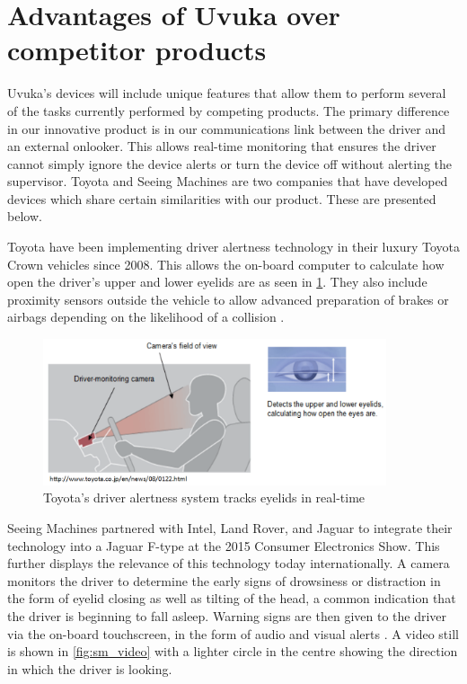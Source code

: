 \section{Advantages of Uvuka over competitor products}
\label{sec:advantages}
Uvuka's devices will include unique features that allow them to perform several of the tasks currently performed by competing products. The primary difference in our innovative product is in our communications link between the driver and an external onlooker. This allows real-time monitoring that ensures the driver cannot simply ignore the device alerts or turn the device off without alerting the supervisor. Toyota and Seeing Machines are two companies that have developed devices which share certain similarities with our product. These are presented below.

Toyota have been implementing driver alertness technology in their luxury Toyota Crown vehicles since 2008. This allows the on-board computer to calculate how open the driver's upper and lower eyelids are as seen in \cref{fig:toyota_sensors}. They also include proximity sensors outside the vehicle to allow advanced preparation of brakes or airbags depending on the likelihood of a collision \cite{toyota}. 
\begin{figure}[H]
\centering
\includegraphics[width=0.9\textwidth]{images/toyota.PNG}
\vskip10pt
\caption[Toyota driver alertness system]{Toyota's driver alertness system tracks eyelids in real-time \cite{toyota}}
\label{fig:toyota_sensors}
\end{figure}
\pagebreak
Seeing Machines partnered with Intel, Land Rover, and Jaguar to integrate their technology into a Jaguar F-type at the 2015 Consumer Electronics Show. This further displays the relevance of this technology today internationally. A camera monitors the driver to determine the early signs of drowsiness or distraction in the form of eyelid closing as well as tilting of the head, a common indication that the driver is beginning to fall asleep. Warning signs are then given to the driver via the on-board touchscreen, in the form of audio and visual alerts \cite{sm_similarities}. A video still is shown in \cref{fig:sm_video} with a lighter circle in the centre showing the direction in which the driver is looking.
